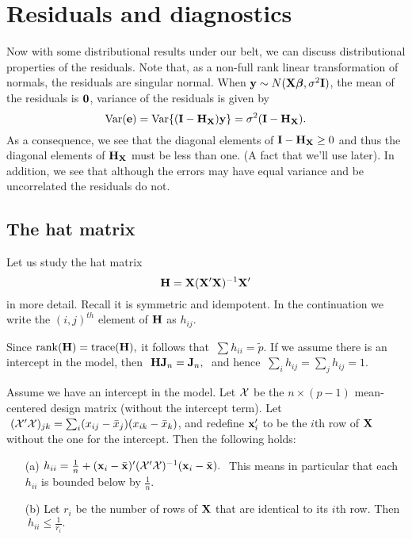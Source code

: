 \section{Residuals and diagnostics}

Now with some distributional results under our belt, we can discuss distributional
properties of the residuals. Note that, as a non-full rank linear transformation of
normals, the residuals are singular normal. When $\mathbf{y} \sim N(\mathbf{X} \boldsymbol{\beta}, \sigma^2 \mathbf{I})$, the mean of the residuals is $\mathbf{0}$, variance of the residuals is given by
$$
\mbox{Var}(\mathbf{e}) = \mbox{Var}\{(\mathbf{I} - \mathbf{H}_{\mathbf{X}})\mathbf{y}\} = \sigma^2 (\mathbf{I} - \mathbf{H}_{\mathbf{X}}).
$$
As a consequence, we see that the diagonal elements of $\mathbf{I} - \mathbf{H}_{\mathbf{X}} \geq 0$
and thus the diagonal elements of $\mathbf{H}_{\mathbf{X}}$ must be less than one. (A fact that
we'll use later). In addition, we see that although the errors may have equal variance and be uncorrelated the residuals do not.


\subsection{The hat matrix}

Let us study the hat matrix $$\mathbf{H} = \mathbf{X} (\mathbf{X}'\mathbf{X})^{-1} \mathbf{X}'$$ in more detail.
Recall it is symmetric and idempotent.
In the continuation we write the $(i,j)^{th}$ element of $\mathbf{H}$ as $h_{ij}$.


Since $\mathrm{rank}(\mathbf{H}) = \mathrm{trace}(\mathbf{H}),$ it follows that
$\ \sum h_{ii} = \tilde{p}$.
If we assume there is an intercept in the model, then $\ \mathbf{H} \mathbf{J}_n =
\mathbf{J}_n,\ $ and hence $\ \sum_i h_{ij} = \sum_j h_{ij} = 1$.

\btheo
Assume we have an intercept in the model.  Let ${\cal X}$ be the $n
\times (p-1)$ mean-centered design matrix (without the intercept term).
Let $\ ({\cal X}'{\cal X})_{jk} =
\sum_i(x_{ij}-\bar{x}_j) (x_{ik}-\bar{x}_k)$, and redefine $\mathbf{x}_i'$
to be the $i$th row of $\mathbf{X}$ without the one for the intercept. Then
the following holds: 
\begin{itemize}
\item[(a)] 
$h_{ii} = \frac{1}{n} + (\mathbf{x}_i - \bar{\mathbf{x}})' ({\cal X}'{\cal
X})^{-1} (\mathbf{x}_i - \bar{\mathbf{x}}).\ $ This means in particular that each
$h_{ii}$ is bounded below by $\frac{1}{n}.$
\item[(b)] 
Let $r_i$ be the number of rows of $\mathbf{X}$ that are identical to its
$i$th row. Then $\ h_{ii} \leq \frac{1}{r_i}.$
\end{itemize}
\etheo

